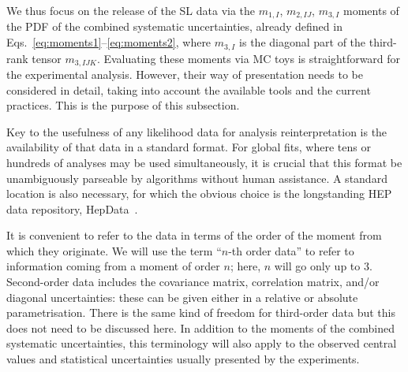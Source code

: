 \documentclass[11pt]{article}
\begin{document}
We thus focus on the release of the  SL data via the  $m_{1,I}$, $m_{2,IJ}$, $m_{3,I}$
moments   of the PDF of the combined systematic uncertainties,  already defined in Eqs.~\eqref{eq:moments1}--\eqref{eq:moments2}, where $m_{3,I}$ is the diagonal part of the third-rank tensor $m_{3,IJK}$.  Evaluating these moments via MC toys is straightforward for the experimental analysis. However, their way of presentation needs to be  
considered in detail, taking into account  the available tools and the current practices. This is the purpose of this subsection.



Key to the usefulness of any likelihood data for analysis reinterpretation is
the availability of that data in a standard format. For global fits, where tens
or hundreds of analyses may be used simultaneously, it is crucial that this
format be unambiguously parseable by algorithms without human assistance. A
standard location is also necessary, for which the obvious choice is the longstanding
HEP data repository, HepData~\cite{hepdata}.


It is convenient to refer to the data in terms of
the order of the moment from which they originate. We will use the term ``$n$-th
order data'' to refer to information coming from a moment of order $n$; here, $n$
will go only up to $3$. Second-order data includes the covariance matrix,
correlation matrix, and/or diagonal uncertainties: these can be given either in a
relative or absolute parametrisation. There is the same kind of freedom for
third-order data but this does not need to be discussed here. In addition to the
moments of the combined systematic uncertainties, this terminology will also
apply to the observed central values and statistical uncertainties usually
presented by the experiments.
\end{document}
